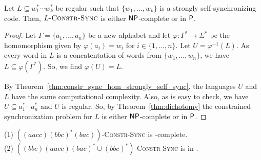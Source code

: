 \begin{theoremrep}
 Let $L \subseteq w_1^* \cdots w_k^*$
 be regular such that $\{ w_1, \ldots, w_k \}$
 is a strongly self-synchronizing code.
 Then, $L\textsc{-Constr-Sync}$
 is either $\textsf{NP}$-complete or in $\textsf{P}$. %
\end{theoremrep}
\begin{proof}
 Let $\Gamma = \{ a_1, \ldots, a_n \}$
 be a new alphabet and let $\varphi : \Gamma^* \to \Sigma^*$
 be the homomorphism given by
 $\varphi(a_i) = w_i$ for $i \in \{1,\ldots, n\}$.
 Let $U = \varphi^{-1}(L)$. 
 As every word in $L$
 is a concatentation of words from $\{ w_1, \ldots, w_n \}$,
 we have $L \subseteq \varphi(\Gamma^*)$.
 So, we find $\varphi(U) = L$.

 By Theorem~\ref{thm:constr_sync_hom_strongly_self_sync},
 the languages $U$ and $L$
 have the same computational complexity.
 Also, as is easy to check, we have $U \subseteq a_1^* \cdots a_n^*$
 and $U$ is regular.
 So, by Theorem~\ref{thm:dichotomy}
 the constrained synchronization problem for $L$
 is either $\textsf{NP}$-complete or in $\textsf{P}$.
\end{proof}

\begin{example}
 (1) $((aacc)(bbc)^*(bac))$\textsc{-Constr-Sync} is \NP-complete. \\
 (2) $((bbc)(aacc)(bac)^* \cup (bbc)^*)$\textsc{-Constr-Sync} is in \PTIME.
\end{example}


